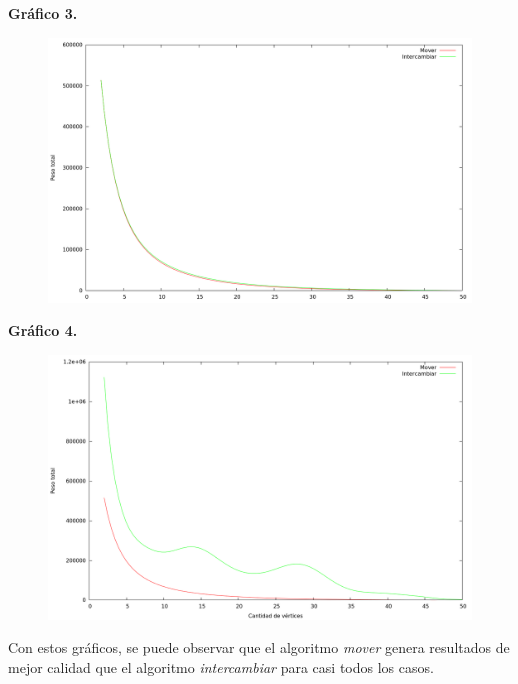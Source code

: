 \textbf{Gráfico 3.}
\begin{figure}[H]
  \begin{center}
    \includegraphics[scale=0.35]{imagenes/local-goloso-k-peso.png}
  \end{center}
\end{figure}

\newpage

\textbf{Gráfico 4.}
\begin{figure}[H]
  \begin{center}
    \includegraphics[scale=0.35]{imagenes/local-random-k-peso.png}
  \end{center}
\end{figure}

\vspace*{0.5cm}

Con estos gráficos, se puede observar que el algoritmo \textit{mover} genera
resultados de mejor calidad que el algoritmo \textit{intercambiar} para casi
todos los casos.


